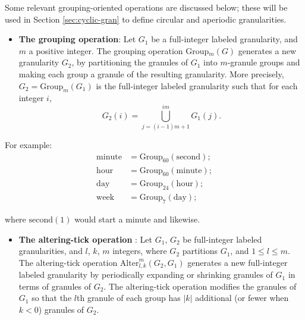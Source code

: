 \documentclass[12pt]{article}
\providecommand{\tightlist}{%
  \setlength{\itemsep}{0pt}\setlength{\parskip}{0pt}}
\begin{document}
Some relevant grouping-oriented operations are discussed below; these will be used in Section \ref{sec:cyclic-gran} to define circular and aperiodic granularities.

\begin{itemize}
\tightlist
\item
  \textbf{The grouping operation}: Let \(G_1\) be a full-integer labeled granularity, and \(m\) a positive integer. The grouping operation Group\(_m(G)\) generates a new granularity \(G_2\), by partitioning the granules of \(G_1\) into \(m\)-granule groups and making each group a granule of the resulting granularity. More precisely, \(G_2 = \text{Group}_m(G_1)\) is the full-integer labeled granularity such that for each integer \(i\),
  \[G_2(i) = \bigcup\limits_{j = (i-1)m+1}^{im} G_1(j).\]
\end{itemize}


For example:
\begin{align*}
  \text{minute} &= \text{Group}_{60}(\text{second});\\
  \text{hour}   &= \text{Group}_{60}(\text{minute});\\
  \text{day}    &= \text{Group}_{24}(\text{hour});\\
  \text{week}   &= \text{Group}_{7}(\text{day});
\end{align*}

where \(\text{second}(1)\) would start a minute and likewise.


\begin{itemize}
\tightlist
\item
  \textbf{The altering-tick operation} : Let \(G_1\), \(G_2\) be full-integer labeled granularities, and \(l\), \(k\), \(m\) integers, where \(G_2\) partitions \(G_1\), and \(1 \leq l \leq m\). The altering-tick operation \(\text{Alter}^{m}_{l,k} (G_2, G_1)\) generates a new full-integer labeled granularity by periodically expanding or shrinking granules of \(G_1\) in terms of granules of \(G_2\). The altering-tick operation modifies the granules of \(G_1\) so that the \(l\)th granule of each group has \(|k|\) additional (or fewer when \(k < 0\)) granules of \(G_2\).
\end{itemize}
\end{document}
